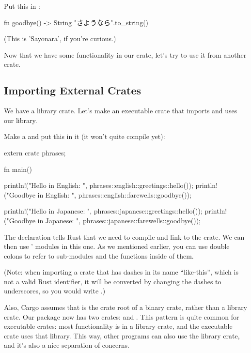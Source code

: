 Put this in :

\begin{rustc}
fn goodbye() -> String {
    "さようなら".to_string()
}
\end{rustc}

(This is 'Sayōnara', if you're curious.)

\blank

Now that we have some functionality in our crate, let's try to use it from another crate.

\subsection*{Importing External Crates}

We have a library crate. Let's make an executable crate that imports and uses our library.

\blank

Make a  and put this in it (it won't quite compile yet):

\begin{rustc}
extern crate phrases;

fn main() {
    println!("Hello in English: {}", phrases::english::greetings::hello());
    println!("Goodbye in English: {}", phrases::english::farewells::goodbye());

    println!("Hello in Japanese: {}", phrases::japanese::greetings::hello());
    println!("Goodbye in Japanese: {}", phrases::japanese::farewells::goodbye());
}
\end{rustc}

The  declaration tells Rust that we need to compile and link to the  crate. We can then use ' 
modules in this one. As we mentioned earlier, you can use double colons to refer to sub-modules and the functions inside of them.

\blank

(Note: when importing a crate that has dashes in its name \enquote{like-this}, which is not a valid Rust identifier, it will be 
converted by changing the dashes to underscores, so you would write .)

\blank

Also, Cargo assumes that  is the crate root of a binary crate, rather than a library crate. Our package now has two 
crates:  and . This pattern is quite common for executable crates: most functionality is in a library 
crate, and the executable crate uses that library. This way, other programs can also use the library crate, and it's also a nice separation 
of concerns.

